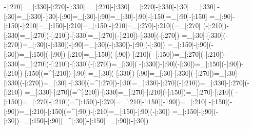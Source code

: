 -[:270]=_[:330]-[:270]-[:330]=_[:270]-[:330]=_[:270]-[:330]-[:30]=_[:330]%
-[:30]=_[:330]-[:30]-[:90]=_[:30]-[:90]=_[:30]-[:90]-[:150]=_[:90]-[:150]%
=_[:90]-[:150]-[:210]=_[:150]-[:210]=_[:150]-[:210]=_[:270]-[:210](=_[:270]%
(-[:210])-[:330]=_[:270](-[:210])-[:330]=_[:270](-[:210])-[:330](-[:270])%
=_[:30]-[:330](-[:270])=_[:30](-[:330])-[:90]=_[:30](-[:330])-[:90](-[:30])%
=_[:150]-[:90](-[:30])=_[:150](-[:90])-[:210]=_[:150](-[:90])-[:210](%
-[:150])=_[:270](-[:210])-[:330]=_[:270](-[:210])-[:330](-[:270])=_[:30](%
-[:330])-[:90](-[:30])=_[:150](-[:90])-[:210])-[:150](=^[:210])-[:90]%
=_[:30](-[:330])-[:90]=_[:30]-[:330](-[:270])=_[:30]-[:330](-[:270])=_[:30]%
-[:330](=^[:270])-[:30]=_[:330]-[:270](-[:210])=_[:330]-[:270](-[:210])%
=_[:330]-[:270](=^[:210])-[:330]=_[:270]-[:210](-[:150])=_[:270]-[:210](%
-[:150])=_[:270]-[:210](=^[:150])-[:270]=_[:210]-[:150](-[:90])=_[:210]%
-[:150](-[:90])=_[:210]-[:150](=^[:90])-[:210]=_[:150]-[:90](-[:30])%
=_[:150]-[:90](-[:30])=_[:150]-[:90](=^[:30])-[:150]=_[:90](-[:30])